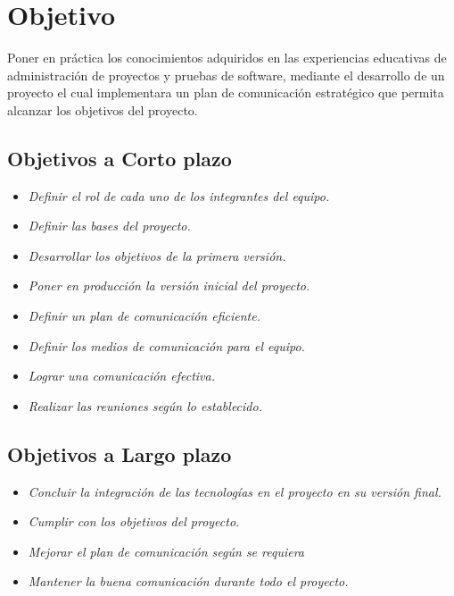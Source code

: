 \documentclass[12pt,a4paper]{article}
\date{\today}
\begin{document}


\section{Objetivo}
Poner en práctica los conocimientos adquiridos en las experiencias educativas de administración de proyectos y pruebas de software, mediante el desarrollo de un proyecto el cual implementara un plan de comunicación estratégico que permita alcanzar los objetivos del proyecto.

\subsection{Objetivos a Corto plazo}
\begin{itemize}
\item \textit{Definir el rol de cada uno de los integrantes del equipo.}
\item \textit{Definir las bases del proyecto.}
\item \textit{Desarrollar los objetivos de la primera versión.}
\item \textit{Poner en producción la versión inicial del proyecto.}
\item \textit{Definir un plan de comunicación eficiente.}
\item \textit{Definir los medios de comunicación para el equipo.}
\item \textit{Lograr una comunicación efectiva.}
\item \textit{Realizar las reuniones según lo establecido.}
\end{itemize}
\vspace{0.5 cm} 

\subsection{Objetivos a Largo plazo}
\begin{itemize}
\item \textit{Concluir la integración de las tecnologías en el proyecto en su versión final.}
\item \textit{Cumplir con los objetivos del proyecto.}
\item \textit{Mejorar el plan de comunicación según se requiera}
\item \textit{Mantener la buena comunicación durante todo el proyecto.}
\end{itemize}
\end{document}
